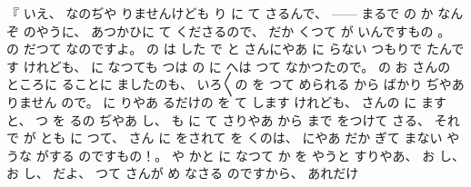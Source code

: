%
『
いえ、
%
なのぢや
りませんけども
り
に
て
さるんで、
%
{---}{---}%
まるで
の
か%
なんぞ
のやうに、
%
あつかひに
て
くださるので、
%
だか
くつて
が
いんですもの
。
%
%
の
だつて
なのですよ。
%
の
は
した
で
と
さんにやあ
に
らない
つもりで
たんです
けれども、
%
に
%
なつても
つは
の
に
へは
つて
なかつたので。
%
の
%
お
さんの
ところに
ることに
ましたのも、
%
いろ〳〵の
を
つて
められる
から
ばかり
ぢやあ
りません
ので。
%
に
りやあ
るだけの
を
て
します
けれども、
%
さんの
%
に
ますと、
%
つ
を
るの
ぢやあ
し、
%
も
に
て
さりやあ
から
まで
をつけて
さる、
%
それで
が
とも
に
つて、
%
さん
に
をされて
を
%
くのは、
%
にやあ
だか
ぎて
まない
やうな
がする
のですもの！。
%
や%
かと
に
なつて
か
を
やうと
すりやあ、
%
お
し、
%
お
し、
%
だよ、
%
つて
さんが
め
なさる
のですから、
%
あれだけ
